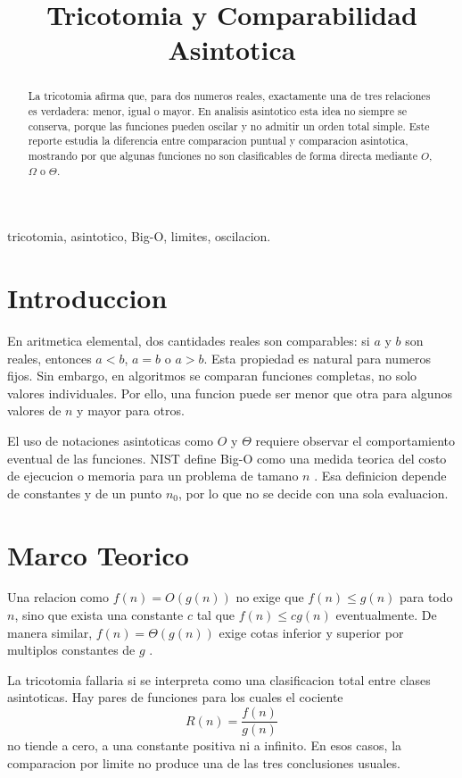 \documentclass[conference]{IEEEtran}
\title{Tricotomia y Comparabilidad Asintotica}
\author{\IEEEauthorblockN{Ronquillo Nunez Braulio}
\IEEEauthorblockA{Analisis y Diseno de Algoritmos}}
\begin{document}
\maketitle

\begin{abstract}
La tricotomia afirma que, para dos numeros reales, exactamente una de tres
relaciones es verdadera: menor, igual o mayor. En analisis asintotico esta
idea no siempre se conserva, porque las funciones pueden oscilar y no admitir
un orden total simple. Este reporte estudia la diferencia entre comparacion
puntual y comparacion asintotica, mostrando por que algunas funciones no son
clasificables de forma directa mediante $O$, $\Omega$ o $\Theta$.
\end{abstract}

\begin{IEEEkeywords}
tricotomia, asintotico, Big-O, limites, oscilacion.
\end{IEEEkeywords}

\section{Introduccion}
En aritmetica elemental, dos cantidades reales son comparables: si $a$ y $b$
son reales, entonces $a<b$, $a=b$ o $a>b$. Esta propiedad es natural para
numeros fijos. Sin embargo, en algoritmos se comparan funciones completas, no
solo valores individuales. Por ello, una funcion puede ser menor que otra para
algunos valores de $n$ y mayor para otros.

El uso de notaciones asintoticas como $O$ y $\Theta$ requiere observar el
comportamiento eventual de las funciones. NIST define Big-O como una medida
teorica del costo de ejecucion o memoria para un problema de tamano $n$
\cite{nist_big_o}. Esa definicion depende de constantes y de un punto $n_0$,
por lo que no se decide con una sola evaluacion.

\section{Marco Teorico}
Una relacion como $f(n)=O(g(n))$ no exige que $f(n)\leq g(n)$ para todo $n$,
sino que exista una constante $c$ tal que $f(n)\leq c g(n)$ eventualmente.
De manera similar, $f(n)=\Theta(g(n))$ exige cotas inferior y superior por
multiplos constantes de $g$ \cite{nist_theta}.

La tricotomia fallaria si se interpreta como una clasificacion total entre
clases asintoticas. Hay pares de funciones para los cuales el cociente
\begin{equation}
R(n)=\frac{f(n)}{g(n)}
\end{equation}
no tiende a cero, a una constante positiva ni a infinito. En esos casos,
la comparacion por limite no produce una de las tres conclusiones usuales.
\end{document}
